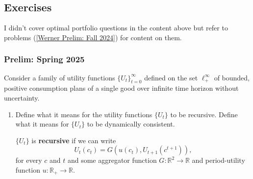 \documentclass[11pt,english]{article}
\begin{document}
\subsection{Exercises}
I didn't cover optimal portfolio questions in the content above but refer to problems (\ref{Werner Prelim: Fall 2024}) for content on them.

\subsubsection{Prelim: Spring 2025}\label{Werner Prelim: Spring 2025}
Consider a family of utility functions $\{U_t\}_{t=0}^{\infty}$ defined on the set $\ell_+^{\infty}$ of bounded, positive consumption plans of a single good over infinite time horizon without uncertainty.

\begin{enumerate}[label = (\alph*)]
    \item Define what it means for the utility functions $\{U_t\}$ to be recursive. Define what it means for $\{U_t\}$ to be dynamically consistent.
\begin{solution}
$\{U_t\}$ is \textbf{recursive} if we can write $$U_t(c_t) = G(u(c_t), U_{t+1}(c^{t+1})),$$ for every $c$ and $t$ and some aggregator function $G:\mathbb{R}^2 \to \mathbb{R}$ and period-utility function $u:\mathbb{R}_+ \to \mathbb{R}.$


\end{solution}
\end{enumerate}
\end{document}
